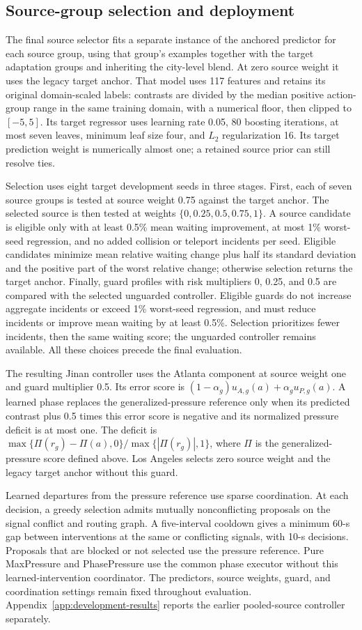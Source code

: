 \subsection{Source-group selection and deployment}
\label{sec:source-selector}
The final source selector fits a separate instance of the anchored predictor for each source group, using that group's examples together with the target adaptation groups and inheriting the city-level blend. At zero source weight it uses the legacy target anchor. That model uses 117 features and retains its original domain-scaled labels: contrasts are divided by the median positive action-group range in the same training domain, with a numerical floor, then clipped to $[-5,5]$. Its target regressor uses learning rate 0.05, 80 boosting iterations, at most seven leaves, minimum leaf size four, and $L_2$ regularization 16. Its target prediction weight is numerically almost one; a retained source prior can still resolve ties.

Selection uses eight target development seeds in three stages. First, each of seven source groups is tested at source weight 0.75 against the target anchor. The selected source is then tested at weights $\{0,0.25,0.5,0.75,1\}$. A source candidate is eligible only with at least 0.5\% mean waiting improvement, at most 1\% worst-seed regression, and no added collision or teleport incidents per seed. Eligible candidates minimize mean relative waiting change plus half its standard deviation and the positive part of the worst relative change; otherwise selection returns the target anchor. Finally, guard profiles with risk multipliers 0, 0.25, and 0.5 are compared with the selected unguarded controller. Eligible guards do not increase aggregate incidents or exceed 1\% worst-seed regression, and must reduce incidents or improve mean waiting by at least 0.5\%. Selection prioritizes fewer incidents, then the same waiting score; the unguarded controller remains available. All these choices precede the final evaluation.

The resulting Jinan controller uses the Atlanta component at source weight one and guard multiplier 0.5. Its error score is $(1-\alpha_g)u_{A,g}(a)+\alpha_g u_{P,g}(a)$. A learned phase replaces the generalized-pressure reference only when its predicted contrast plus 0.5 times this error score is negative and its normalized pressure deficit is at most one. The deficit is $\max\{\Pi(r_g)-\Pi(a),0\}/\max\{|\Pi(r_g)|,1\}$, where $\Pi$ is the generalized-pressure score defined above. Los Angeles selects zero source weight and the legacy target anchor without this guard.

Learned departures from the pressure reference use sparse coordination. At each decision, a greedy selection admits mutually nonconflicting proposals on the signal conflict and routing graph. A five-interval cooldown gives a minimum 60-s gap between interventions at the same or conflicting signals, with 10-s decisions. Proposals that are blocked or not selected use the pressure reference. Pure MaxPressure and PhasePressure use the common phase executor without this learned-intervention coordinator. The predictors, source weights, guard, and coordination settings remain fixed throughout evaluation. Appendix~\ref{app:development-results} reports the earlier pooled-source controller separately.
